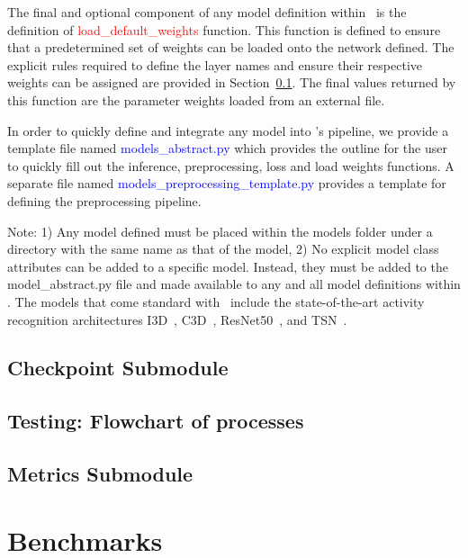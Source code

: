 \documentclass{llncs}
\begin{document}
The final and optional component of any model definition within \acro~is the definition of \textcolor{red}{load\_default\_weights} function.
This function is defined to ensure that a predetermined set of weights can be loaded onto the network defined.
The explicit rules required to define the layer names and ensure their respective weights can be assigned are provided in Section~\ref{sec:checkpoint}.
The final values returned by this function are the parameter weights loaded from an external file. 

In order to quickly define and integrate any model into \acro's pipeline, we provide a template file named \textcolor{blue}{models\_abstract.py} which provides the outline for the user to quickly fill out the inference, preprocessing, loss and load weights functions.
A separate file named \textcolor{blue}{models\_preprocessing\_template.py} provides a template for defining the preprocessing pipeline.

Note: 1) Any model defined must be placed within the models folder under a directory with the same name as that of the model,
2) No explicit model class attributes can be added to a specific model. Instead, they must be added to the model\_abstract.py file and made available to any and all model definitions within \acro.
The models that come standard with \acro~include the state-of-the-art activity recognition architectures I3D~\cite{}, C3D~\cite{}, ResNet50~\cite{}, and TSN~\cite{}.

\subsection{Checkpoint Submodule}
\label{sec:checkpoint}

\subsection{Testing: Flowchart of processes}
\label{sec:testing}

\subsection{Metrics Submodule}
\label{sec:metrics}

\section{Benchmarks}
\label{sec:benchmarks}

\clearpage



\end{document}
